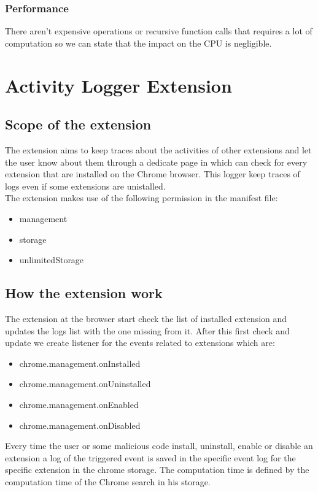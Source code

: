 \documentclass[12pt]{article}
\begin{document}
\begin{multicols}{2}
\subsubsection*{Performance}
There aren't expensive operations or recursive function calls that requires a lot of computation so we can state that the impact on the CPU is negligible.
\section*{Activity Logger Extension}

\subsection*{Scope of the extension}

The extension aims to keep traces about the activities of other extensions and let the user know
about them through a dedicate page in which can check for every extension that are installed on the
Chrome browser. This logger keep traces of logs even if some extensions are unistalled. \\
The extension makes use of the following permission in the manifest file:
\begin{itemize}
	\item  management
	\item  storage
	\item  unlimitedStorage
\end{itemize}
\subsection*{How the extension work}
The extension at the browser start check the list of installed extension and updates the logs list with the one missing from it.
After this first check and update we create listener for the events related to extensions which are: 
\begin{itemize}
	\item  chrome.management.onInstalled
	\item  chrome.management.onUninstalled
	\item  chrome.management.onEnabled
	\item  chrome.management.onDisabled
\end{itemize}
Every time the user or some malicious code install, uninstall, enable or disable an extension a log of the triggered event is saved in the specific event log for the specific extension in the chrome storage.
The computation time is defined by the computation time of the Chrome search in his storage.

\end{multicols}
\end{document}
